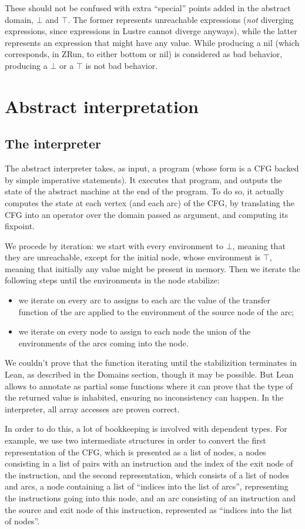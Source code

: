 \documentclass{scrartcl}
\begin{document}
These should not be confused with extra ``special'' points added in the abstract domain, $\bot$
and $\top$.  The former represents unreachable expressions (\emph{not} diverging expressions,
since expressions in Lustre cannot diverge anyways), while the latter represents an expression
that might have any value.  While producing a nil (which corresponds, in ZRun, to either bottom
or nil) is considered as bad behavior, producing a $\bot$ or a $\top$ is not bad behavior.

\section{Abstract interpretation}
\subsection{The interpreter}
The abstract interpreter takes, as input, a program (whose form is a CFG backed by simple
imperative statements).  It executes that program, and outputs the state of the abstract machine
at the end of the program.  To do so, it actually computes the state at each vertex (and each
arc) of the CFG, by translating the CFG into an operator over the domain passed as argument, and
computing its fixpoint.

We procede by iteration: we start with every environment to $\bot$, meaning that they are
unreachable, except for the initial node, whose environment is $\top$, meaning that initially any
value might be present in memory. Then we iterate the following steps until the environments in
the node stabilize:
\begin{itemize}
\item we iterate on every arc to assigns to each arc the value of the transfer function of the
  arc applied to the environment of the source node of the arc;
\item we iterate on every node to assign to each node the union of the environments of the arcs
  coming into the node.
\end{itemize}

We couldn't prove that the function iterating until the stabilizition terminates in Lean, as
described in the Domains section, though it may be possible. But Lean allows to annotate as
partial some functions where it can prove that the type of the returned value is inhabited,
ensuring no inconsistency can happen.  In the interpreter, all array accesses are proven correct.

In order to do this, a lot of bookkeeping is involved with dependent types.  For example, we use
two intermediate structures in order to convert the first representation of the CFG, which is
presented as a list of nodes, a nodes consisting in a list of pairs with an instruction and the
index of the exit node of the instruction, and the second representation, which consists of a
list of nodes and arcs, a node containing a list of ``indices into the list of arcs'',
representing the instructions going into this node, and an arc consisting of an instruction and
the source and exit node of this instruction, represented as ``indices into the list of nodes''.
\end{document}

